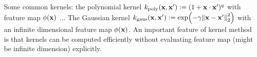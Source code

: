\begin{example}[kernels]
	Some common kernels: 
	the polynomial kernel $k_{\text{poly}}(\vb{x},\vb{x}') := (1+\vb{x}\cdot\vb{x}')^q$ with feature map $\phi(\vb{x})$ ...
	The Gaussian kernel
	$k_{\text{gaus}}(\vb{x},\vb{x}') := \exp(-\gamma\norm{\vb{x}-\vb{x}'}^2_2)$ 
	with an infinite dimensional feature map $\phi(\vb{x})$.
	An important feature of kernel method is that kernels can be computed efficiently without evaluating feature map (might be infinite dimension) explicitly.




\end{example}

